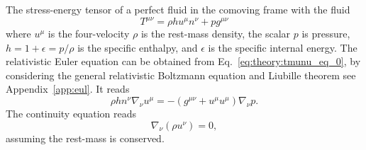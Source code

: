 The stress-energy tensor of a perfect fluid in the comoving frame with the fluid
%
\begin{equation}
    T^{\mu\nu} = \rho h u^{\mu}n^{\nu} + p g^{\mu\nu}
    \label{eq:theory:tmunu_perf}
\end{equation}
%
where $u^{\mu}$ is the four-velocity
$\rho$ is the rest-mass density, the scalar $p$ is pressure, 
$h = 1 + \epsilon = p/\rho$ is the specific enthalpy, and $\epsilon$ is the specific internal energy.
%
The relativistic Euler equation can be obtained from Eq.~\eqref{eq:theory:tmunu_eq_0}, 
by considering the general relativistic Boltzmann equation and Liubille theorem 
see Appendix~\ref{app:eul}.
It reads 
%
\begin{equation}
\rho h n^{\nu} \nabla_{\nu}u^{\mu} = - (g^{\mu\nu} + u^{\mu}u^{\mu})\nabla_{\nu}p.
\end{equation}
%
The continuity equation reads 
%
\begin{equation}
    \nabla_{\nu}(\rho u^{\nu}) = 0,
    \label{eq:theory:contineq}
\end{equation}
%
assuming the rest-mass is conserved.



